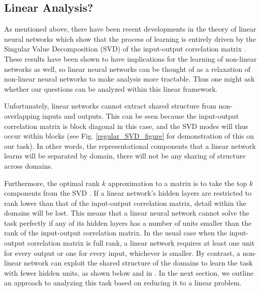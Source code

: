 \documentclass[10pt,letterpaper]{article}
\begin{document}
\subsection{Linear Analysis?}
As mentioned above, there have been recent developments in the theory of linear neural networks which show that the process of learning is entirely driven by the Singular Value Decomposition (SVD) of the input-output correlation matrix \citep{Saxe2013}. These results have been shown to have implications for the learning of non-linear networks as well, so linear neural networks can be thought of as a relaxation of non-linear neural networks to make analysis more tractable. Thus one might ask whether our questions can be analyzed within this linear framework. \par
Unfortunately, linear networks cannot extract shared structure from non-overlapping inputs and outputs. This can be seen because the input-output correlation matrix is block diagonal in this case, and the SVD modes will thus occur within blocks (see Fig. \ref{regular_SVD_figure} for demonstration of this on our task). In other words, the representational components that a linear network learns will be separated by domain, there will not be any sharing of structure across domains.\par 
Furthermore, the optimal rank $k$ approximation to a matrix is to take the top $k$ components from the SVD \citep{Golub1987, Mirsky1960}. If a linear network's hidden layers are restricted to rank lower than that of the input-output correlation matrix, detail within the domains will be lost. This means that a linear neural network cannot solve the task perfectly if any of its hidden layers has a number of units smaller than the rank of the input-output correlation matrix. In the usual case when the input-output correlation matrix is full rank, a linear network requires at least one unit for every output or one for every input, whichever is smaller. By contrast, a non-linear network can exploit the shared structure of the domains to learn the task with fewer hidden units, as shown below and in \citep{Hinton1986}. In the next section, we outline an approach to analyzing this task based on reducing it to a linear problem.
\end{document}
